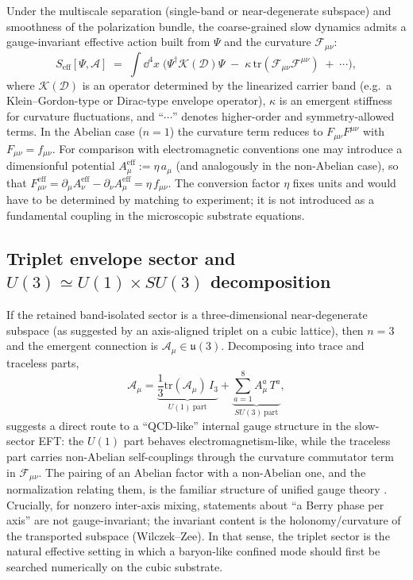 Under the multiscale separation (single-band or near-degenerate subspace) and smoothness of the polarization bundle,
the coarse-grained slow dynamics admits a gauge-invariant effective action built from $\Psi$ and the curvature
$\mathcal{F}_{\mu\nu}$:
\begin{equation}
  S_{\text{eff}}[\Psi,\mathcal{A}]
  \;=\;\int \dd^4x\;
  \Big(
    \Psi^\dagger \mathcal{K}(\mathcal{D}) \Psi
    \;-\;\kappa\,\mathrm{tr}(\mathcal{F}_{\mu\nu}\mathcal{F}^{\mu\nu})
    \;+\;\cdots
  \Big),
  \label{eq:Seff}
\end{equation}
where $\mathcal{K}(\mathcal{D})$ is an operator determined by the linearized carrier band (e.g.\ a Klein--Gordon-type or
Dirac-type envelope operator), $\kappa$ is an emergent stiffness for curvature fluctuations, and ``$\cdots$'' denotes
higher-order and symmetry-allowed terms.
In the Abelian case ($n=1$) the curvature term reduces to $F_{\mu\nu}F^{\mu\nu}$ with $F_{\mu\nu}=f_{\mu\nu}$.
For comparison with electromagnetic conventions one may introduce a dimensionful potential
$A^{\mathrm{eff}}_\mu := \eta\,a_\mu$ (and analogously in the non-Abelian case),
so that $F^{\mathrm{eff}}_{\mu\nu}=\partial_\mu A^{\mathrm{eff}}_\nu-\partial_\nu A^{\mathrm{eff}}_\mu=\eta\,f_{\mu\nu}$.
The conversion factor $\eta$ fixes units and would have to be determined by matching to experiment; it is not introduced
as a fundamental coupling in the microscopic substrate equations.

\subsection{\texorpdfstring{Triplet envelope sector and $U(3)\simeq U(1)\times SU(3)$ decomposition}{Triplet envelope sector and U(3) ~= U(1) x SU(3) decomposition}}
\label{subsec:triplet-u3}

If the retained band-isolated sector is a three-dimensional near-degenerate subspace (as suggested by an axis-aligned
triplet on a cubic lattice), then $n=3$ and the emergent connection is $\mathcal{A}_\mu\in\mathfrak{u}(3)$.
Decomposing into trace and traceless parts,
\begin{equation}
  \mathcal{A}_\mu
  = \underbrace{\frac{1}{3}\mathrm{tr}(\mathcal{A}_\mu)\,I_3}_{U(1)\ \text{part}}
  + \underbrace{\sum_{a=1}^{8}A^a_\mu\,T^a}_{SU(3)\ \text{part}},
  \label{eq:u3-decomp}
\end{equation}
suggests a direct route to a ``QCD-like'' internal gauge structure in the slow-sector EFT:
the $U(1)$ part behaves electromagnetism-like, while the traceless part carries non-Abelian self-couplings through
the curvature commutator term in $\mathcal{F}_{\mu\nu}$.
The pairing of an Abelian factor with a non-Abelian one, and the normalization relating them, is the familiar
structure of unified gauge theory \citep{GeorgiGlashow1974,BaezHuerta2010GUTAlgebra}.
Crucially, for nonzero inter-axis mixing, statements about ``a Berry phase per axis'' are not gauge-invariant; the
invariant content is the holonomy/curvature of the transported subspace (Wilczek--Zee).
In that sense, the triplet sector is the natural effective setting in which a baryon-like confined mode should first be
searched numerically on the cubic substrate.

